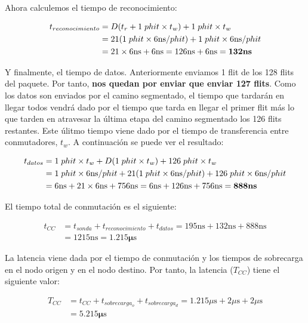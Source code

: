 \documentclass[11pt,a4paper]{article}
\begin{document}
Ahora calculemos el tiempo de reconocimiento:

\begin{equation}
\begin{split}
t_{reconocimiento} &= D(t_r + 1\;phit \times t_w) + 1\;phit \times t_w\\
& = 21(1\;phit \times 6\text{ns}/phit) + 1\;phit \times 6\text{ns}/phit \\
&= 21 \times 6\text{ns} + 6\text{ns} = 126\text{ns} + 6\text{ns} = \mathbf{132}\textbf{\text{ns}}
\end{split}
\end{equation}

Y finalmente, el tiempo de datos. Anteriormente enviamos 1 flit de los 128 flits del paquete.
Por tanto, \textbf{nos quedan por enviar que enviar 127 flits}. Como los datos son enviados
por el camino segmentado, el tiempo que tardarán en llegar todos vendrá dado por el tiempo
que tarda en llegar el primer flit más lo que tarden en atravesar la última etapa del camino
segmentado los 126 flits restantes. Este úlitmo tiempo viene dado por el tiempo de transferencia
entre conmutadores, $t_w$. A continuación se puede ver el resultado:

\begin{equation}
\begin{split}
t_{datos} &= 1\;phit \times t_w + D(1\;phit \times t_w) + 126\;phit \times t_w\\
& = 1\;phit \times 6\text{ns}/phit + 21(1\;phit \times 6\text{ns}/phit) + 126\;phit \times 6\text{ns}/phit \\
&= 6\text{ns} + 21 \times 6\text{ns} + 756\text{ns} = 6\text{ns} + 126\text{ns} + 756\text{ns} = \mathbf{888}\textbf{\text{ns}}
\end{split}
\end{equation}

El tiempo total de conmutación es el siguiente:

\begin{equation}
\begin{split}
t_{CC} &= t_{sonda} + t_{reconocimiento} + t_{datos} = 195\text{ns} + 132\text{ns} + 888\text{ns}
\\
&= 1215\text{ns} = \mathbf{1.215\mu}\text{s}
\end{split}
\end{equation}

La latencia viene dada por el tiempo de conmutación y los tiempos de sobrecarga en el nodo
origen y en el nodo destino. Por tanto, la latencia ($T_{CC}$) tiene el siguiente valor:

\begin{equation}
\begin{split}
T_{CC} &= t_{CC} + t_{sobrecarga_o} + t_{sobrecarga_d} = 1.215\mu \text{s} + 2\mu \text{s} + 2\mu \text{s} \\
&= \mathbf{5.215\mu}\text{s}
\end{split}
\end{equation}
\end{document}
